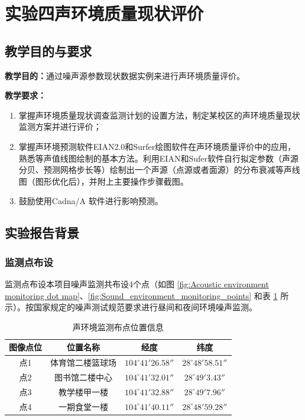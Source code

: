 \newpage\null\par
\section{实验四\hspace{1em}声环境质量现状评价}
\subsection{教学目的与要求}
\noindent\textbf{教学目的：}通过噪声源参数现状数据实例来进行声环境质量评价。

\noindent\textbf{教学要求：}
\begin{enumerate}
    \item 掌握声环境质量现状调查监测计划的设置方法，制定某校区的声环境质量现状监测方案并进行评价；
    \item 掌握声环境预测软件EIAN2.0和Surfer绘图软件在声环境质量评价中的应用，熟悉等声值线图绘制的基本方法。利用EIAN和Sufer软件自行拟定参数（声源分贝、预测网格步长等）绘制出一个声源（点源或者面源）的分布衰减等声线图（图形优化后），并附上主要操作步骤截图。
    \item 鼓励使用Cadna/A 软件进行影响预测。
\end{enumerate}


\subsection{实验报告背景}
\subsubsection{监测点布设}
监测点布设本项目噪声监测共布设4个点（如图 \ref{fig:Acoustic environment monitoring dot map}、\ref{fig:Sound_environment_monitoring_points} 和表 \ref{tab:Acoustic environment monitoring location information} 所示）。按国家规定的噪声测试规范要求进行昼间和夜间环境噪声监测。

\begin{table}[H]
    \centering
    \caption{声环境监测布点位置信息}
    \begin{tabular}{cccc}
        \toprule
        图像点位 & 位置名称 & 经度 & 纬度 \\
        \midrule
        点1 & 体育馆二楼篮球场 & $104^{\circ}41'26.58''$ & $28^{\circ}48'58.51''$ \\
        点2 & 图书馆二楼中心 & $104^{\circ}41'32.01''$ & $28^{\circ}49'3.43''$ \\
        点3 & 教学楼甲一楼 & $104^{\circ}41'32.88''$ & $28^{\circ}49'7.96''$ \\
        点4 & 一期食堂一楼 & $104^{\circ}41'40.11''$ & $28^{\circ}48'59.28''$ \\
        \bottomrule
    \end{tabular}
    \label{tab:Acoustic environment monitoring location information}
\end{table}

